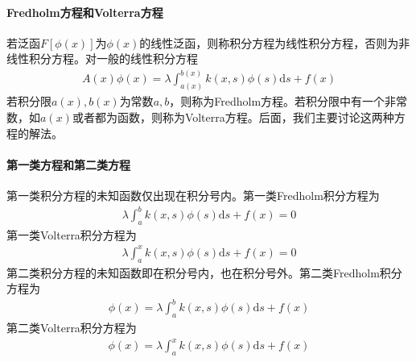 	\paragraph{Fredholm方程和Volterra方程}
	若泛函$F[\phi(x)]$为$\phi(x)$的线性泛函，则称积分方程为线性积分方程，否则为非线性积分方程。对一般的线性积分方程
	\begin{align*}
		A(x)\phi(x) = \lambda \int_{a(x)}^{b(x)} k(x,s) \phi(s)\mathrm{d}s + f(x)
	\end{align*}
	若积分限$a(x),b(x)$为常数$a,b$，则称为Fredholm方程。若积分限中有一个非常数，如$a(x)$或者都为函数，则称为Volterra方程。后面，我们主要讨论这两种方程的解法。
	\paragraph{第一类方程和第二类方程}
	第一类积分方程的未知函数仅出现在积分号内。第一类Fredholm积分方程为
	\begin{align*}
		\lambda \int_{a}^{b} k(x,s) \phi(s)\mathrm{d}s + f(x) = 0
	\end{align*}
	第一类Volterra积分方程为
	\begin{align*}
		\lambda \int_{a}^{x} k(x,s) \phi(s)\mathrm{d}s + f(x) = 0
	\end{align*}
	第二类积分方程的未知函数即在积分号内，也在积分号外。第二类Fredholm积分方程为
	\begin{align*}
		\phi(x) = \lambda \int_{a}^{b} k(x,s) \phi(s)\mathrm{d}s + f(x)
	\end{align*}
	第二类Volterra积分方程为
	\begin{align*}
		\phi(x) = \lambda \int_{a}^{x} k(x,s) \phi(s)\mathrm{d}s + f(x)
	\end{align*}
